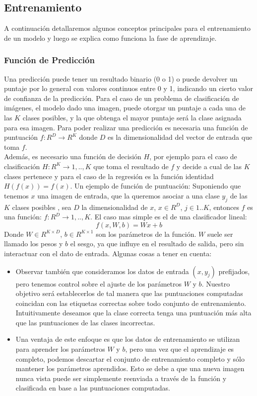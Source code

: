 \documentclass[a4paper,11pt,spanish]{book}
\begin{document}
      \subsection{Entrenamiento}
	A continuación detallaremos algunos conceptos principales para el entrenamiento de un modelo y luego se explica como funciona la fase de aprendizaje.
	\subsubsection{Función de Predicción \label{sec:prediccion}}
	  Una predicción puede tener un resultado binario (0 o 1) o puede devolver un puntaje por lo general con valores continuos entre 0 y 1, indicando un cierto valor de confianza
	  de la predicción. Para el caso de un problema de clasificación de imágenes, el modelo dado una imagen, puede otorgar un puntaje a cada una de las $K$ clases posibles,
	  y la que obtenga el mayor puntaje será la clase asignada para esa imagen. Para poder realizar una predicción es necesaria una función de puntuación $f:R^D {\rightarrow} R^K$
	  donde $D$ es la dimensionalidad del vector de entrada que toma $f$. \\
	  Además, es necesario una función de decisión $H$, por ejemplo para el caso de clasificación $H:R^K{\rightarrow}{1,..,K}$
	  que toma el resultado de $f$ y decide a cual de las $K$ clases pertenece y para el caso de la regresión es la función identidad $H(f(x))=f(x)$.
	  Un ejemplo de función de puntuación:
	  Suponiendo que tenemos $x$ una imagen de entrada, que la queremos asociar a una clase $y_{j}$ de las $K$ clases posibles , sea $D$ la dimensionalidad de $x$, $x \in R^D$,
	  $j \in 1..K$, entonces $f$ es una función: $f:R^D {\rightarrow} {1,..,K}$. El caso mas simple es el de una clasificador lineal:\\
	  \begin{equation}
	    f(x, W, b) = W x + b
	  \end{equation}
	  Donde $W \in R^{K \times D}$, $b \in R^{K \times 1}$ son los parámetros de la función. $W$ suele ser llamado los pesos y $b$ el sesgo, ya que influye en el resultado de salida, pero sin
	  interactuar con el dato de entrada.
	  Algunas cosas a tener en cuenta:
	  \begin{itemize}
	   \item Observar también que consideramos los datos de entrada $(x, y_{j})$  prefijados, pero tenemos control sobre el ajuste de los parámetros $W$ y $b$.
		 Nuestro objetivo será establecerlos de tal manera que las puntuaciones computadas coincidan con las etiquetas correctas sobre todo conjunto de entrenamiento.
		 Intuitivamente deseamos que la clase correcta tenga una puntuación más alta que las puntuaciones de las clases incorrectas.
	   \item Una ventaja de este enfoque es que los datos de entrenamiento se utilizan para aprender los parámetros $W$ y $b$, pero una vez que el aprendizaje es completo,
		podemos descartar el conjunto de entrenamiento completo y sólo mantener los parámetros aprendidos. Esto se debe a que una nueva imagen nunca vista puede ser
		simplemente reenviada a través de la función y clasificada en base a las puntuaciones computadas.
	  \end{itemize}
\end{document}
